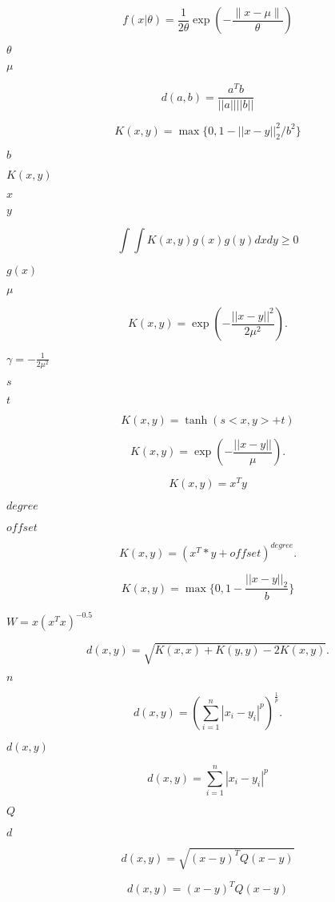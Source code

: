 \documentclass{article}
\begin{document}
\[ f(x|\theta) = \frac{1}{2 \theta}\exp\left(-\frac{\|x - \mu\|}{\theta}\right) \]
\pagebreak

$\theta$
\pagebreak

$\mu$
\pagebreak

\[ d(a, b) = \frac{a^T b}{|| a || || b ||} \]
\pagebreak

\[ K(x, y) = \max \{0, 1 - || x - y ||^2_2 / b^2 \} \]
\pagebreak

$ b $
\pagebreak

$ K(x, y) $
\pagebreak

$ x $
\pagebreak

$ y $
\pagebreak

\[ \int \int K(x, y) g(x) g(y) dx dy \ge 0 \]
\pagebreak

$ g(x) $
\pagebreak

$ \mu $
\pagebreak

\[ K(x, y) = \exp(-\frac{|| x - y ||^2}{2 \mu^2}). \]
\pagebreak

$ \gamma = -\frac{1}{2 \mu^2} $
\pagebreak

$ s $
\pagebreak

$ t $
\pagebreak

\[ K(x, y) = \tanh(s <x, y> + t) \]
\pagebreak

\[ K(x, y) = \exp(-\frac{|| x - y ||}{\mu}). \]
\pagebreak

\[ K(x, y) = x^T y \]
\pagebreak

$ degree $
\pagebreak

$ offset $
\pagebreak

\[ K(x, y) = (x^T * y + offset) ^ {degree}. \]
\pagebreak

\[ K(x, y) = \max \{ 0, 1 - \frac{|| x - y ||_2}{b} \} \]
\pagebreak

$ W = x (x^T x)^{-0.5} $
\pagebreak

\[ d(x, y) = \sqrt{ K(x, x) + K(y, y) - 2K(x, y) }. \]
\pagebreak

$ n $
\pagebreak

\[ d(x, y) = \left( \sum_{i = 1}^{n} | x_i - y_i |^p \right)^{\frac{1}{p}}. \]
\pagebreak

$ d(x, y) $
\pagebreak

\[ d(x, y) = \sum_{i = 1}^{n} | x_i - y_i |^p \]
\pagebreak

$ Q $
\pagebreak

$ d $
\pagebreak

\[ d(x, y) = \sqrt{(x - y)^T Q (x - y)} \]
\pagebreak

\[ d(x, y) = (x - y)^T Q (x - y) \]
\pagebreak
\end{document}
